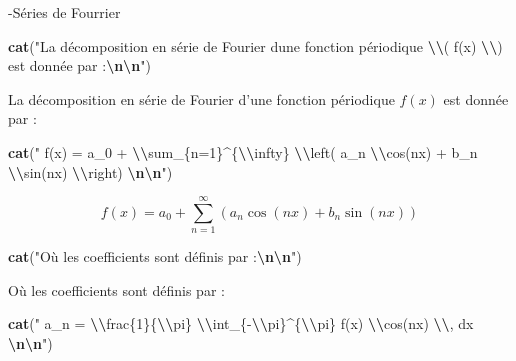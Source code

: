 \documentclass[
]{article}
\newenvironment{Shaded}{\begin{snugshade}}{\end{snugshade}}
\newcommand{\FunctionTok}[1]{\textcolor[rgb]{0.13,0.29,0.53}{\textbf{#1}}}
\newcommand{\NormalTok}[1]{#1}
\newcommand{\SpecialCharTok}[1]{\textcolor[rgb]{0.81,0.36,0.00}{\textbf{#1}}}
\newcommand{\StringTok}[1]{\textcolor[rgb]{0.31,0.60,0.02}{#1}}
\begin{document}
-Séries de Fourrier

\begin{Shaded}
\begin{Highlighting}[]
\FunctionTok{cat}\NormalTok{(}\StringTok{"La décomposition en série de Fourier d\textquotesingle{}une fonction périodique }\SpecialCharTok{\textbackslash{}\textbackslash{}}\StringTok{( f(x) }\SpecialCharTok{\textbackslash{}\textbackslash{}}\StringTok{) est donnée par :}\SpecialCharTok{\textbackslash{}n\textbackslash{}n}\StringTok{"}\NormalTok{)}
\end{Highlighting}
\end{Shaded}

La décomposition en série de Fourier d'une fonction périodique \(f(x)\)
est donnée par :

\begin{Shaded}
\begin{Highlighting}[]
\FunctionTok{cat}\NormalTok{(}\StringTok{"$$ f(x) = a\_0 + }\SpecialCharTok{\textbackslash{}\textbackslash{}}\StringTok{sum\_\{n=1\}\^{}\{}\SpecialCharTok{\textbackslash{}\textbackslash{}}\StringTok{infty\} }\SpecialCharTok{\textbackslash{}\textbackslash{}}\StringTok{left( a\_n }\SpecialCharTok{\textbackslash{}\textbackslash{}}\StringTok{cos(nx) + b\_n }\SpecialCharTok{\textbackslash{}\textbackslash{}}\StringTok{sin(nx) }\SpecialCharTok{\textbackslash{}\textbackslash{}}\StringTok{right) $$}\SpecialCharTok{\textbackslash{}n\textbackslash{}n}\StringTok{"}\NormalTok{)}
\end{Highlighting}
\end{Shaded}

\[ f(x) = a_0 + \sum_{n=1}^{\infty} \left( a_n \cos(nx) + b_n \sin(nx) \right) \]

\begin{Shaded}
\begin{Highlighting}[]
\FunctionTok{cat}\NormalTok{(}\StringTok{"Où les coefficients sont définis par :}\SpecialCharTok{\textbackslash{}n\textbackslash{}n}\StringTok{"}\NormalTok{)}
\end{Highlighting}
\end{Shaded}

Où les coefficients sont définis par :

\begin{Shaded}
\begin{Highlighting}[]
\FunctionTok{cat}\NormalTok{(}\StringTok{"$$ a\_n = }\SpecialCharTok{\textbackslash{}\textbackslash{}}\StringTok{frac\{1\}\{}\SpecialCharTok{\textbackslash{}\textbackslash{}}\StringTok{pi\} }\SpecialCharTok{\textbackslash{}\textbackslash{}}\StringTok{int\_\{{-}}\SpecialCharTok{\textbackslash{}\textbackslash{}}\StringTok{pi\}\^{}\{}\SpecialCharTok{\textbackslash{}\textbackslash{}}\StringTok{pi\} f(x) }\SpecialCharTok{\textbackslash{}\textbackslash{}}\StringTok{cos(nx) }\SpecialCharTok{\textbackslash{}\textbackslash{}}\StringTok{, dx $$}\SpecialCharTok{\textbackslash{}n\textbackslash{}n}\StringTok{"}\NormalTok{)}
\end{Highlighting}
\end{Shaded}
\end{document}
